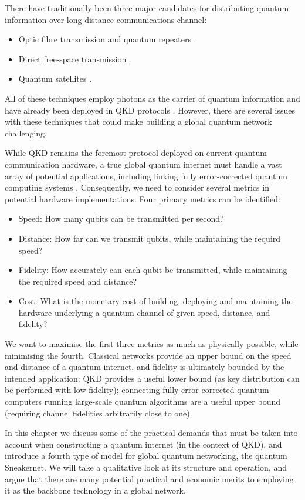 \documentclass[twocolumn, aps, rmp, amsmath, amssymb, nofootinbib, superscriptaddress, longbibliography, floatfix, table-of-contents, eqsecnum]{revtex4-2}
\begin{document}
There have traditionally been three major candidates for distributing quantum information over long-distance communications channel:
\begin{itemize}
\item Optic fibre transmission and quantum repeaters \cite{?}.
\item Direct free-space transmission \cite{?}.
\item Quantum satellites \cite{?}. 
\end{itemize}

All of these techniques employ photons as the carrier of quantum information and have already been deployed in QKD protocols \cite{?}. However, there are several issues with these techniques that could make building a global quantum network challenging. 

While QKD remains the foremost protocol deployed on current quantum communication hardware, a true global quantum internet must handle a vast array of potential applications, including linking fully error-corrected quantum computing systems \cite{?}. Consequently, we need to consider several metrics in potential hardware implementations. Four primary metrics can be identified:
\begin{itemize}
\item Speed: How many qubits can be transmitted per second?
\item Distance: How far can we transmit qubits, while maintaining the requird speed?
\item Fidelity: How accurately can each qubit be transmitted, while maintaining the required speed and distance?
\item Cost: What is the monetary cost of building, deploying and maintaining the hardware underlying a quantum channel of given speed, distance, and fidelity?
\end{itemize}

We want to maximise the first three metrics as much as physically possible, while minimising the fourth. Classical networks provide an upper bound on the speed and distance of a quantum internet, and fidelity is ultimately bounded by the intended application: QKD provides a useful lower bound (as key distribution can be performed with low fidelity); connecting fully error-corrected quantum computers running large-scale quantum algorithms are a useful upper bound (requiring channel fidelities arbitrarily close to one).

In this chapter we discuss some of the practical demands that must be taken into account when constructing a quantum internet (in the context of QKD), and introduce a fourth type of model for global quantum networking, the quantum Sneakernet. We will take a qualitative look at its structure and operation, and argue that there are many potential practical and economic merits to employing it as the backbone technology in a global network.
\end{document}
